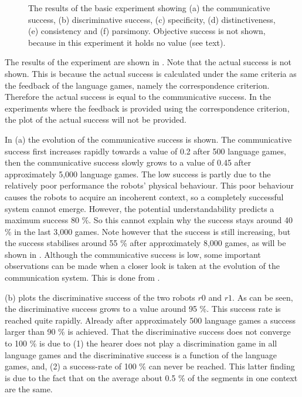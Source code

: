 \begin{figure}
\caption{The results of the basic experiment showing (a) the communicative success, (b) discriminative success, (c) specificity, (d) distinctiveness, (e) consistency and (f) parsimony. Objective success is not shown, because in this experiment it holds no value (see text).}
\label{f:st:plot}
\end{figure}


The results of the experiment are shown in . Note that the actual success is not shown. This is because the actual success is calculated under the same criteria as the feedback of the language games, namely the correspondence criterion. Therefore the actual success is equal to the communicative success. In the experiments where the feedback is provided using the correspondence criterion, the plot of the actual success will not be provided.

In  (a) the evolution of the communicative success is shown. The communicative success first increases rapidly towards a value of 0.2 after 500 language games, then the communicative success slowly grows to a value of 0.45 after approximately 5,000 language games. The low success is partly due to the relatively poor performance the robots' physical behaviour. This poor behaviour causes the robots to acquire an incoherent context, so a completely successful system cannot emerge. However, the potential understandability predicts a maximum success 80 \%. So this cannot explain why the success stays around 40 \% in the last 3,000 games. Note however that the success is still increasing, but the success stabilises around 55 \% after approximately 8,000 games, as will be shown in . Although the communicative success is low, some important observations can be made when a closer look is taken at the evolution of the communication system. This is done from .

 (b) plots the discriminative success of the two robots $r0$ and $r1$. As can be seen, the discriminative success grows to a value around 95 \%. This success rate is reached quite rapidly. Already after approximately 500 language games a success larger than 90 \% is achieved. That the discriminative success does not converge to 100 \% is due to (1) the hearer does not play a discrimination game in all language games and the discriminative success is a function of the language games, and, (2) a success-rate of 100 \% can never be reached. This latter finding is due to the fact that on the average about 0.5 \% of the segments in one context are the same. 

